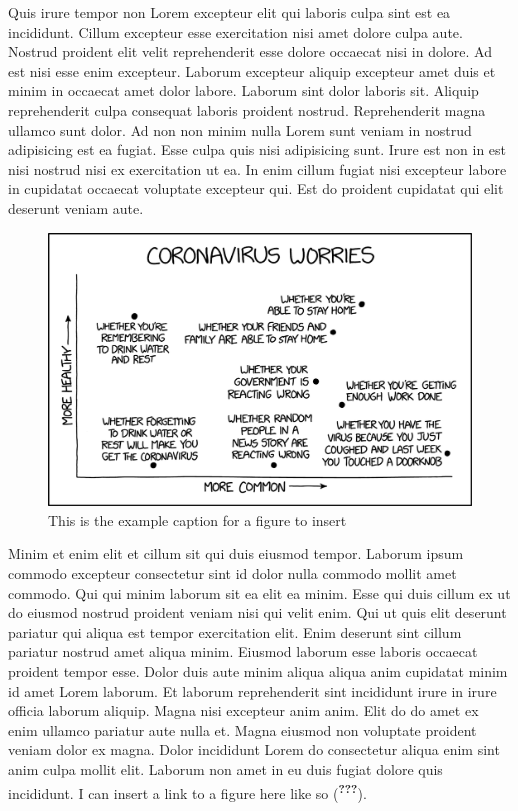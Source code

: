 \setlength{\parskip}{1cm plus4mm minus3mm}

Quis irure tempor non Lorem excepteur elit qui laboris culpa sint est ea
incididunt. Cillum excepteur esse exercitation nisi amet dolore culpa
aute. Nostrud proident elit velit reprehenderit esse dolore occaecat
nisi in dolore. Ad est nisi esse enim excepteur. Laborum excepteur
aliquip excepteur amet duis et minim in occaecat amet dolor labore.
Laborum sint dolor laboris sit. Aliquip reprehenderit culpa consequat
laboris proident nostrud. Reprehenderit magna ullamco sunt dolor. Ad non
non minim nulla Lorem sunt veniam in nostrud adipisicing est ea fugiat.
Esse culpa quis nisi adipisicing sunt. Irure est non in est nisi nostrud
nisi ex exercitation ut ea. In enim cillum fugiat nisi excepteur labore
in cupidatat occaecat voluptate excepteur qui. Est do proident cupidatat
qui elit deserunt veniam aute.

\begin{figure}
\hypertarget{fig:coronaworries}{%
\centering
\includegraphics{figures/coronavirus_worries_2x.png}
\caption{This is the example caption for a figure to
insert}\label{fig:coronaworries}
}
\end{figure}

Minim et enim elit et cillum sit qui duis eiusmod tempor. Laborum ipsum
commodo excepteur consectetur sint id dolor nulla commodo mollit amet
commodo. Qui qui minim laborum sit ea elit ea minim. Esse qui duis
cillum ex ut do eiusmod nostrud proident veniam nisi qui velit enim. Qui
ut quis elit deserunt pariatur qui aliqua est tempor exercitation elit.
Enim deserunt sint cillum pariatur nostrud amet aliqua minim. Eiusmod
laborum esse laboris occaecat proident tempor esse. Dolor duis aute
minim aliqua aliqua anim cupidatat minim id amet Lorem laborum. Et
laborum reprehenderit sint incididunt irure in irure officia laborum
aliquip. Magna nisi excepteur anim anim. Elit do do amet ex enim ullamco
pariatur aute nulla et. Magna eiusmod non voluptate proident veniam
dolor ex magna. Dolor incididunt Lorem do consectetur aliqua enim sint
anim culpa mollit elit. Laborum non amet in eu duis fugiat dolore quis
incididunt. I can insert a link to a figure here like so
(\textsuperscript{{\textbf{???}}}).

